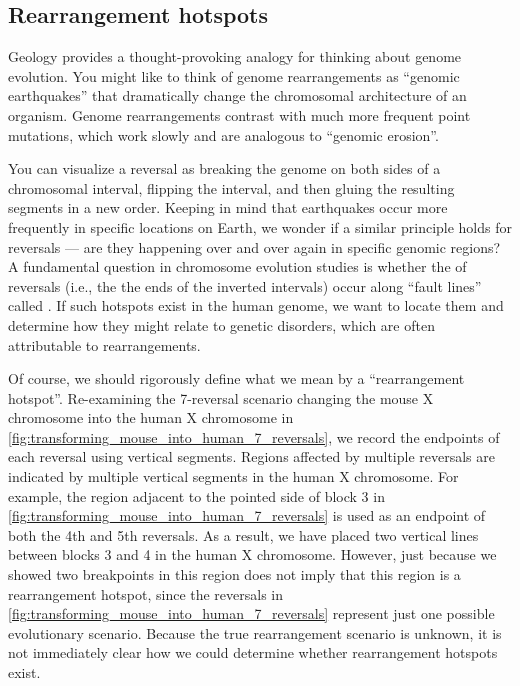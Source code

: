 \subsection{Rearrangement hotspots}
\label{subsec:rearrangement_hotspots}

Geology provides a thought-provoking analogy for thinking about genome evolution.  You might like to think of genome rearrangements as ``genomic earthquakes'' that dramatically change the chromosomal architecture of an organism.  Genome rearrangements contrast with much more frequent point mutations, which work slowly and are analogous to ``genomic erosion''.

You can visualize a reversal as breaking the genome on both sides of a chromosomal interval, flipping the interval, and then gluing the resulting segments in a new order. Keeping in mind that earthquakes occur more frequently in specific locations on Earth, we wonder if a similar principle holds for reversals --- are they happening over and over again in specific genomic regions?  A fundamental question in chromosome evolution studies is whether the  of reversals (i.e., the the ends of the inverted intervals) occur along ``fault lines'' called . If such hotspots exist in the human genome, we want to locate them and determine how they might relate to genetic disorders, which are often attributable to rearrangements.

Of course, we should rigorously define what we mean by a ``rearrangement hotspot''. Re-examining the 7-reversal scenario changing the mouse X chromosome into the human X chromosome in \autoref{fig:transforming_mouse_into_human_7_reversals}, we record the endpoints of each reversal using vertical segments. Regions affected by multiple reversals are indicated by multiple vertical segments in the human X chromosome. For example, the region adjacent to the pointed side of block 3 in \autoref{fig:transforming_mouse_into_human_7_reversals} is used as an endpoint of both the 4th and 5th reversals. As a result, we have placed two vertical lines between blocks 3 and 4 in the human X chromosome. However, just because we showed two breakpoints in this region does not imply that this region is a rearrangement hotspot, since the reversals in \autoref{fig:transforming_mouse_into_human_7_reversals} represent just one possible evolutionary scenario. Because the true rearrangement scenario is unknown, it is not immediately clear how we could determine whether rearrangement hotspots exist.\\

